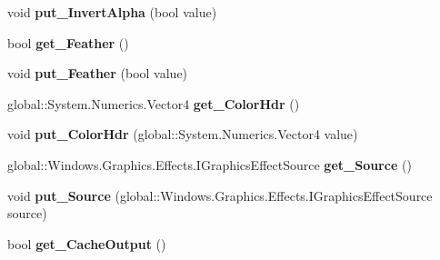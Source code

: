 \begin{DoxyCompactItemize}
void {\bfseries put\+\_\+\+Invert\+Alpha} (bool value)
\item 
\mbox{\label{class_microsoft_1_1_graphics_1_1_canvas_1_1_effects_1_1_chroma_key_effect_a07546ae4422f17d7a007270a0532d5ce}} 
bool {\bfseries get\+\_\+\+Feather} ()
\item 
\mbox{\label{class_microsoft_1_1_graphics_1_1_canvas_1_1_effects_1_1_chroma_key_effect_aeac5b14db9370006dc382733657d23f5}} 
void {\bfseries put\+\_\+\+Feather} (bool value)
\item 
\mbox{\label{class_microsoft_1_1_graphics_1_1_canvas_1_1_effects_1_1_chroma_key_effect_a1fd7380fb44e77126b89905eccd1c946}} 
global\+::\+System.\+Numerics.\+Vector4 {\bfseries get\+\_\+\+Color\+Hdr} ()
\item 
\mbox{\label{class_microsoft_1_1_graphics_1_1_canvas_1_1_effects_1_1_chroma_key_effect_a771d1aecb4d4ffd99cfa7cafea0de2d1}} 
void {\bfseries put\+\_\+\+Color\+Hdr} (global\+::\+System.\+Numerics.\+Vector4 value)
\item 
\mbox{\label{class_microsoft_1_1_graphics_1_1_canvas_1_1_effects_1_1_chroma_key_effect_a9ce5e365c9a88cb7fb4f90d523a7c4a0}} 
global\+::\+Windows.\+Graphics.\+Effects.\+I\+Graphics\+Effect\+Source {\bfseries get\+\_\+\+Source} ()
\item 
\mbox{\label{class_microsoft_1_1_graphics_1_1_canvas_1_1_effects_1_1_chroma_key_effect_a69de4d866611df33bb052046ba1b84da}} 
void {\bfseries put\+\_\+\+Source} (global\+::\+Windows.\+Graphics.\+Effects.\+I\+Graphics\+Effect\+Source source)
\item 
\mbox{\label{class_microsoft_1_1_graphics_1_1_canvas_1_1_effects_1_1_chroma_key_effect_ada4e79dd2a24dda09784c79b527a0680}} 
bool {\bfseries get\+\_\+\+Cache\+Output} ()

\end{DoxyCompactItemize}
